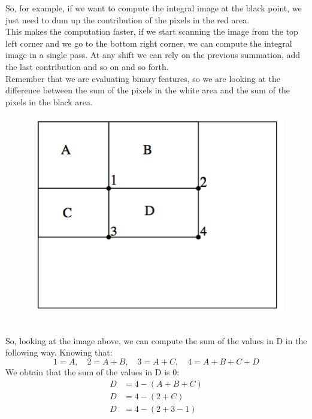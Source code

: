 So, for example, if we want to compute the integral image at the black point, we just need to dum up the contribution of the pixels in the red area.
\\This makes the computation faster, if we start scanning the image from the top left corner and we go to the bottom right corner, we can compute the integral image in a single pass.
At any shift we can rely on the previous summation, add the last contribution and so on and so forth.
\\Remember that we are evaluating binary features, so we are looking at the difference between the sum of the pixels in the white area and the sum of the pixels in the black area.
\begin{figure}[h]
    \centering
    \includegraphics[scale=0.4]{Figures/IntegralImage2.png}
\end{figure}
\\So, looking at the image above, we can compute the sum of the values in D in the following way.
Knowing that: 
\[1 = A,\quad 2 = A + B,\quad 3 = A + C,\quad 4 = A + B + C + D\]
We obtain that the sum of the values in D is $0$:
\begin{equation}
    \begin{split}
        D & = 4 - (A + B + C) \\
        D & = 4 - (2 + C) \\
        D & = 4 - (2 + 3 - 1) 
    \end{split}
\end{equation}

